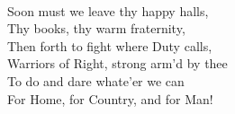 \documentclass[10pt,b5j]{tarticle} %
\begin{document}
\begin{enumerate}
\begin{minipage}[c]{\blocksize}
    \end{minipage}
    \begin{minipage}[c]{\blocksize}
        
        \vspace{\linespace}
        \item~\\
        Soon must we leave thy happy halls,\\
          Thy books, thy warm fraternity,\\
        Then forth to fight where Duty calls,\\
          Warriors of Right, strong arm'd by thee\\
            To do and dare whate'er we can\\
            For Home, for Country, and for Man!
    
    \end{minipage}
\end{enumerate} %
\end{document}
